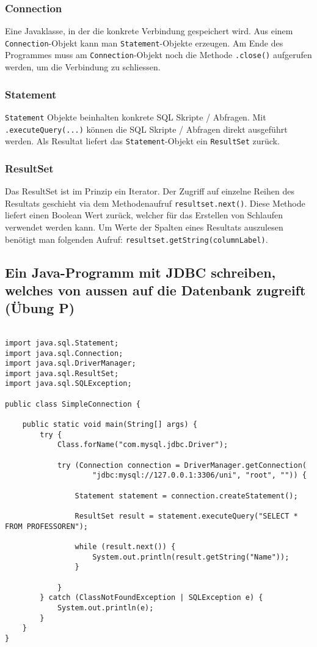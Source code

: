 \subsubsection{Connection}
Eine Javaklasse, in der die konkrete Verbindung gespeichert wird. Aus einem \verb|Connection|-Objekt kann man \verb|Statement|-Objekte erzeugen. Am Ende des Programmes muss am \verb|Connection|-Objekt noch die Methode \verb|.close()| aufgerufen werden, um die Verbindung zu schliessen.
\subsubsection{Statement}
\verb|Statement| Objekte beinhalten konkrete SQL Skripte / Abfragen. Mit \verb|.executeQuery(...)| können die SQL Skripte / Abfragen direkt ausgeführt werden. Als Resultat liefert das \verb|Statement|-Objekt ein \verb|ResultSet| zurück.

\subsubsection{ResultSet}
Das ResultSet ist im Prinzip ein Iterator. Der Zugriff auf einzelne Reihen des Resultats geschieht via dem Methodenaufruf \verb|resultset.next()|. Diese Methode liefert einen Boolean Wert zurück, welcher für das Erstellen von Schlaufen verwendet werden kann. Um Werte der Spalten eines Resultats auszulesen benötigt man folgenden Aufruf: \verb|resultset.getString(columnLabel)|. 

\newpage
\subsection{Ein Java-Programm mit JDBC schreiben, welches von aussen auf die Datenbank zugreift (Übung P)}

\begin{lstlisting}[caption={JDBC Beispielprogramm},label=lst:jdbc_sample]

import java.sql.Statement;
import java.sql.Connection;
import java.sql.DriverManager;
import java.sql.ResultSet;
import java.sql.SQLException;

public class SimpleConnection {

    public static void main(String[] args) {
        try {
            Class.forName("com.mysql.jdbc.Driver");

            try (Connection connection = DriverManager.getConnection(
                    "jdbc:mysql://127.0.0.1:3306/uni", "root", "")) {

                Statement statement = connection.createStatement();

                ResultSet result = statement.executeQuery("SELECT * FROM PROFESSOREN");

                while (result.next()) {
                    System.out.println(result.getString("Name"));
                }

            }
        } catch (ClassNotFoundException | SQLException e) {
            System.out.println(e);
        }
    }
}
\end{lstlisting}


